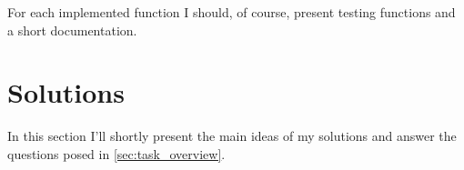\documentclass[11pt]{article}
\begin{document}
For each implemented function I should, of course, present testing functions and a short documentation. 


\section{Solutions} %
\label{sec:solutions}

In this section I'll shortly present the main ideas of my solutions and answer the questions posed in \cref{sec:task_overview}. 




% 
\end{document}
